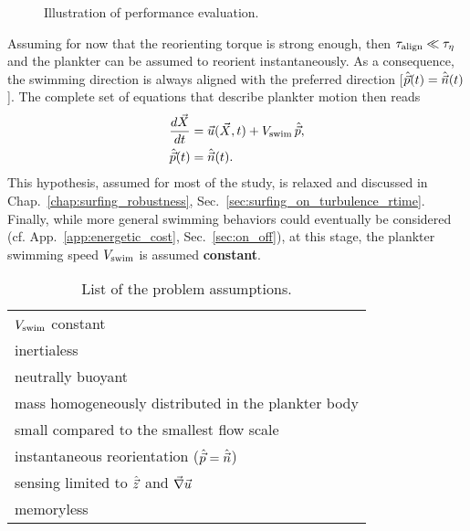 \begin{wrapfigure}[9]{R}[0.5\width]{0.35\textwidth}
	\centering
	\vspace{-10pt}
	\def\svgwidth{0.3\textwidth}
	
	\captionsetup{width=0.3\textwidth}
  	\caption{Illustration of performance evaluation.}
  	\label{fig:performance_description}
\end{wrapfigure}
Assuming for now that the reorienting torque is strong enough, then $\tau_{\mathrm{align}} \ll \tau_{\eta}$ and the plankter can be assumed to reorient instantaneously.
As a consequence, the swimming direction is always aligned with the preferred direction [$\hat{\vec{p}}(t) = \hat{\vec{n}}(t)$].
The complete set of equations that describe plankter motion then reads
\begin{subequations}\label{eq:surfing_motion}
	\begin{align}
		\frac{d \vec{X}}{dt} &= \vec{u} (\vec{X}, t) + V_{\mathrm{swim}} \, \hat{\vec{p}}, \\
		\hat{\vec{p}}(t) &= \hat{\vec{n}}(t).
	\end{align}
\end{subequations}
This hypothesis, assumed for most of the study, is relaxed and discussed in Chap.~\ref{chap:surfing_robustness}, Sec.~\ref{sec:surfing_on_turbulence_rtime}.
Finally, while more general swimming behaviors could eventually be considered (cf. App.~\ref{app:energetic_cost}, Sec.~\ref{sec:on_off}), at this stage, the plankter swimming speed $V_{\mathrm{swim}}$ is assumed \textbf{constant}.
\begin{table}
	\center
	\begin{tabular*}{\textwidth}{ l }
		\toprule
		{} $V_{\mathrm{swim}}$ constant \\
		{} inertialess \\
		{} neutrally buoyant \\
		{} mass homogeneously distributed in the plankter body \\
		{} small compared to the smallest flow scale \\
		{} instantaneous reorientation ($\hat{\vec{p}} = \hat{\vec{n}}$) \\
		{} sensing limited to $\hat{\vec{z}}$ and $\vec{\nabla} \vec{u}$ \\
		{} memoryless \\
		\bottomrule
	\end{tabular*}
	\caption{
		List of the problem assumptions.
	}
	\label{tab:problem_assumptions}
\end{table}

